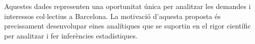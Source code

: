 \documentclass[final,10pt]{article}
\begin{document}
Aquestes dades representen una oportunitat \'unica per analitzar les demandes i interessos col$\cdot$lectius a Barcelona.
La motivaci\'o d'aquesta proposta \'es precissament desenvolupar eines anal\'itiques que se suportin en el rigor cient\'ific per analitzar i fer infer\`encies
estad\'istiques.

%
%
%
%
%
%
%
\end{document}
